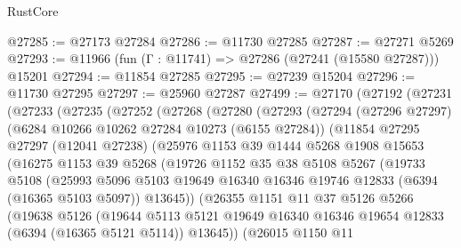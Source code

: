 \begin{lexlean}{RustCore}
\begin{coremodule}
@27285 := @27173 @27284
@27286 := @11730 @27285
@27287 := @27271 @5269
@27293 := @11966 (fun (Γ : @11741) => @27286 (@27241 (@15580 @27287))) @15201
@27294 := @11854 @27285
@27295 := @27239 @15204
@27296 := @11730 @27295
@27297 := @25960 @27287
@27499 := @27170
    (@27192
      (@27231
        (@27233
          (@27235
            (@27252
              (@27268
                (@27280
                  (@27293
                    (@27294
                      (@27296 @27297)
                      (@6284 @10266 @10262 @27284 @10273 (@6155 @27284))
                      (@11854
                        @27295
                        @27297
                        (@12041 @27238)
                        (@25976
                          @1153
                          @39
                          @1444
                          @5268
                          @1908
                          @15653
                          (@16275
                            @1153
                            @39
                            @5268
                            (@19726
                              @1152
                              @35
                              @38
                              @5108
                              @5267
                              (@19733
                                @5108
                                (@25993
                                  @5096
                                  @5103
                                  @19649
                                  @16340
                                  @16346
                                  @19746
                                  @12833
                                  (@6394 (@16365 @5103 @5097))
                                  @13645))
                              (@26355
                                @1151
                                @11
                                @37
                                @5126
                                @5266
                                (@19638
                                  @5126
                                  (@19644
                                    @5113
                                    @5121
                                    @19649
                                    @16340
                                    @16346
                                    @19654
                                    @12833
                                    (@6394 (@16365 @5121 @5114))
                                    @13645))
                                (@26015
                                  @1150
                                  @11

\end{coremodule}
\end{lexlean}
